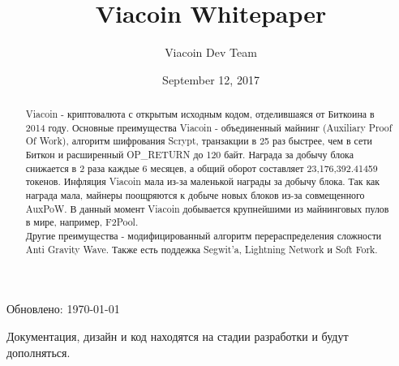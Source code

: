 \documentclass{article}
\author{Viacoin Dev Team}
\title{Viacoin Whitepaper}
\date{September 12, 2017}
\begin{document}
\maketitle
{\normalfont
      Обновлено: \today}

\begin{abstract}\noindent
\normalsize Viacoin - криптовалюта с открытым исходным кодом, отделившаяся от
Биткоина \cite{bitcoin2008} в 2014 году. Основные преимущества Viacoin - объединенный
майнинг (Auxiliary Proof Of Work), алгоритм шифрования Scrypt, транзакции в 25 раз быстрее,
чем в сети Биткон и расширенный OP\_RETURN до 120 байт. Награда за добычу блока снижается
в 2 раза каждые 6 месяцев, а общий оборот составляет 23,176,392.41459 токенов.
Инфляция Viacoin мала из-за маленькой награды за добычу блока. Так как награда мала,
майнеры поощряются к добыче новых блоков из-за совмещенного AuxPoW. В данный
момент Viacoin добывается крупнейшими из  майнинговых пулов в мире, например, F2Pool.
~\\
Другие преимущества - модифицированный алгоритм перераспределения сложности Anti Gravity Wave. Также есть поддежка Segwit'a, Lightning Network и Soft Fork.
\end{abstract}


\vfill \noindent
\small Документация, дизайн и код находятся на стадии разработки и будут дополняться.

\newpage

\normalsize
\end{document}

